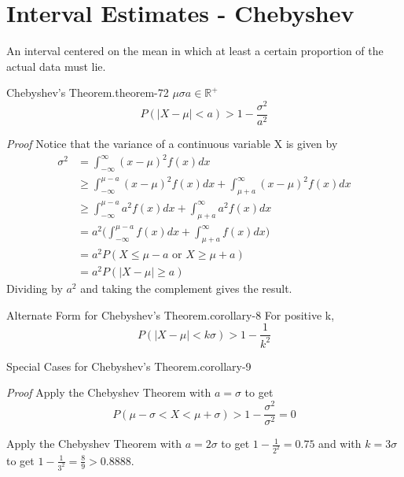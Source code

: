 \documentclass[10pt,]{book}
\makeatletter
\renewcommand*{\proofname}{Proof}
\renewenvironment{proof}[1][\proofname]{\par
  \pushQED{\qed}%
  \normalfont \topsep6\p@\@plus6\p@\relax
  \trivlist
  \item\relax
    {\itshape
    #1\@addpunct{.}}\hspace\labelsep\ignorespaces
}{%
  \popQED\endtrivlist\@endpefalse
}
\numberwithin{equation}{section}
\newcommand{\lt}{<}
\newcommand{\gt}{>}
\makeatother
\begin{document}
\section[{Interval Estimates - Chebyshev}]{Interval Estimates - Chebyshev}\label{section-66}
\hypertarget{p-1320}{}%
An interval centered on the mean in which at least a certain proportion of the actual data must lie.%
\begin{theorem}{Chebyshev's Theorem.}{}{theorem-72}%
\(\mu\)\(\sigma\)\(a \in \mathbb{R}^+\)%
\begin{equation*}
P( \big | X - \mu \big | \lt a ) \gt 1 - \frac{\sigma^2}{a^2}
\end{equation*}
\end{theorem}
\begin{proof}\hypertarget{proof-71}{}
\hypertarget{p-1321}{}%
Notice that the variance of a continuous variable X is given by%
\begin{align*}
\sigma^2 & = \int_{-\infty}^{\infty} (x - \mu)^2 f(x) dx\\
& \ge \int_{-\infty}^{\mu-a} (x - \mu)^2 f(x) dx + \int_{\mu + a}^{\infty} (x - \mu)^2 f(x) dx\\
& \ge \int_{-\infty}^{\mu-a} a^2 f(x) dx + \int_{\mu + a}^{\infty} a^2 f(x) dx\\
& = a^2 \big ( \int_{-\infty}^{\mu-a} f(x) dx + \int_{\mu + a}^{\infty} f(x) dx \big )\\
& = a^2 P( X \le \mu - a \text{  or  } X \ge \mu + a )\\
& = a^2 P( \big | X - \mu \big | \ge a)
\end{align*}
Dividing by \(a^2\) and taking the complement gives the result.%
\end{proof}
\begin{corollary}{Alternate Form for Chebyshev's Theorem.}{}{corollary-8}%
\hypertarget{p-1322}{}%
For positive k,%
\begin{equation*}
P( \big | X - \mu \big | \lt k \sigma ) \gt 1 - \frac{1}{k^2}
\end{equation*}
%
\end{corollary}
\begin{corollary}{Special Cases for Chebyshev's Theorem.}{}{corollary-9}%
\end{corollary}
\begin{proof}\hypertarget{proof-72}{}
\hypertarget{p-1323}{}%
Apply the Chebyshev Theorem with \(a = \sigma\) to get%
\begin{equation*}
P(\mu - \sigma \lt X \lt \mu + \sigma) \gt 1 - \frac{\sigma^2}{\sigma^2} = 0
\end{equation*}
%
\par
\hypertarget{p-1324}{}%
Apply the Chebyshev Theorem with \(a = 2 \sigma\) to get \(1 - \frac{1}{2^2} = 0.75\) and with \(k = 3 \sigma\) to get \(1 - \frac{1}{3^2} = \frac{8}{9} > 0.8888\).%
\end{proof}
\end{document}
